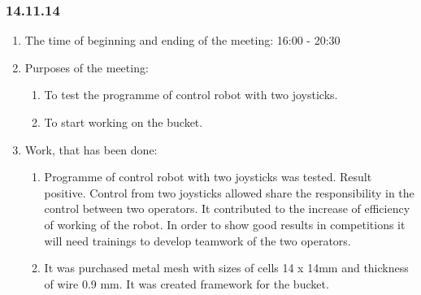 
\subsubsection{14.11.14}

\begin{enumerate} 
	\item The time of beginning and ending of the meeting:
	16:00 - 20:30
	\item Purposes of the meeting:
	\begin{enumerate}
		\item To test the programme of control robot with two joysticks.
		
		\item To start working on the bucket.
		
	\end{enumerate}
	
	\item Work, that has been done:
	\begin{enumerate}
		\item Programme of control robot with two joysticks was tested. Result positive. Control from two joysticks allowed share the responsibility in the control between two operators. It contributed to the increase of  efficiency of working of the robot. In order to show good results in competitions it will need trainings to develop teamwork of the two operators.
		
		\item It was purchased metal mesh with sizes of cells 14 x 14mm and thickness of wire 0.9 mm. It was created framework for the bucket.
		

\end{enumerate}
\end{enumerate}
